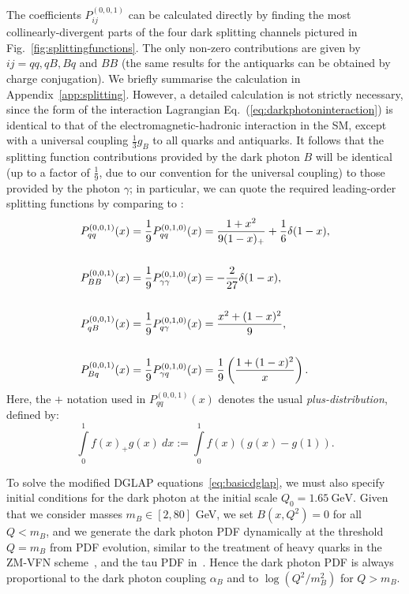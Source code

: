 \documentclass[withindex,glossary]{cam-thesis}
\begin{document}
%
The coefficients $P_{ij}^{(0,0,1)}$ can be calculated directly by
finding the most collinearly-divergent parts of the four dark
splitting channels pictured in Fig.~\ref{fig:splittingfunctions}. The only non-zero contributions are given by $ij=qq, qB, Bq$ and $BB$ (the same results for the antiquarks can be obtained by charge conjugation).
We briefly summarise the calculation in Appendix~\ref{app:splitting}.
%
However, a detailed calculation is not strictly necessary, since the form
of the interaction Lagrangian Eq.~(\ref{eq:darkphotoninteraction}) is identical
to that of the electromagnetic-hadronic interaction in the SM,
except with a universal coupling $\frac{1}{3}g_B$ to all quarks and antiquarks.
It follows that the splitting function contributions provided by the
dark photon $B$ will be identical (up to a factor of $\frac{1}{9}$, due to
our convention for the universal coupling) to those provided by the
photon $\gamma$; in particular, we can quote the required leading-order
splitting functions by comparing to \cite{Bertone:2015lqa}:
\begin{align}
\label{eq:splittingfunctions}
P_{qq}^{(0,0,1)}(x) &= \frac{1}{9}P_{qq}^{(0,1,0)}(x) = \frac{1+x^2}{9(1-x)_+} + \frac{1}{6} \delta(1-x), \notag\\\notag\\
 P_{BB}^{(0,0,1)}(x) &= \frac{1}{9} P_{\gamma\gamma}^{(0,1,0)}(x)= -\frac{2}{27}\delta(1-x), \notag\\ \\
P_{qB}^{(0,0,1)}(x) &= \frac{1}{9} P_{q\gamma}^{(0,1,0)}(x) = \frac{x^2 + (1-x)^2}{9},\notag\\\notag\\
 P_{Bq}^{(0,0,1)}(x) &= \frac{1}{9} P_{\gamma q}^{(0,1,0)}(x) = \frac{1}{9} \left( \frac{1 + (1-x)^2}{x} \right). \notag
\end{align}
Here, the $+$ notation used in $P_{qq}^{(0,0,1)}(x)$ denotes
the usual \textit{plus-distribution}, defined by:
\begin{equation}
\label{eq:plusdistribution}
\int\limits_{0}^{1} f(x)_+ g(x)\ dx := \int \limits_{0}^{1} f(x) (g(x) - g(1)).
\end{equation}

To solve the modified DGLAP equations~\eqref{eq:basicdglap}, we must
also specify initial conditions for the dark photon at the initial scale $Q_0 = 1.65\ \text{GeV}$. 
Given that we consider masses $m_B \in [2,80]$ GeV, we set $B(x,Q^2)
= 0$ for all $Q < m_B$, and we generate the dark photon PDF dynamically
at the threshold $Q = m_B$ from PDF evolution, similar to the
treatment of heavy quarks in the ZM-VFN scheme~\cite{Maltoni:2012pa,Bertone:2017djs}, and the tau
PDF in~\cite{Bertone:2015lqa}. Hence the dark photon PDF is always
proportional to the dark photon coupling $\alpha_B$ and to
$\log(Q^2/m_B^2)$ for $Q>m_B$. 
\end{document}
